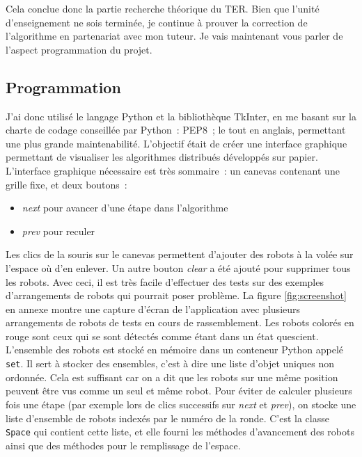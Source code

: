 Cela conclue donc la partie recherche théorique du TER. Bien que l'unité
d'enseignement ne sois terminée, je continue à prouver la correction de
l'algorithme en partenariat avec mon tuteur. Je vais maintenant vous parler de
l'aspect programmation du projet.

\subsection{Programmation}

J'ai donc utilisé le langage Python et la bibliothèque TkInter, en me basant
sur la charte de codage conseillée par Python~: PEP8~; le tout en anglais,
permettant une plus grande maintenabilité. L'objectif était de créer une
interface graphique permettant de visualiser les algorithmes distribués
développés sur papier. \\

L'interface graphique nécessaire est très sommaire~: un canevas contenant une
grille fixe, et deux boutons~:
\begin{itemize}
  \item \emph{next} pour avancer d'une étape dans l'algorithme
  \item \emph{prev} pour reculer
\end{itemize}
Les clics de la souris sur le canevas permettent d'ajouter des robots à la
volée sur l'espace où d'en enlever. Un autre bouton \emph{clear} a été ajouté
pour supprimer tous les robots. Avec ceci, il est très facile d'effectuer des
tests sur des exemples d'arrangements de robots qui pourrait poser problème. La
figure \ref{fig:screenshot} en annexe montre une capture d'écran de
l'application avec plusieurs arrangements de robots de tests en cours de
rassemblement. Les robots colorés en rouge sont ceux qui se sont détectés comme
étant dans un état quescient. \\

L'ensemble des robots est stocké en mémoire dans un conteneur Python appelé
\texttt{set}. Il sert à stocker des ensembles, c'est à dire une liste d'objet
uniques non ordonnée. Cela est suffisant car on a dit que les robots sur une
même position peuvent être vus comme un seul et même robot.  Pour éviter de
calculer plusieurs fois une étape (par exemple lors de clics successifs sur
\emph{next} et \emph{prev}), on stocke une liste d'ensemble de robots indexés
par le numéro de la ronde. C'est la classe \texttt{Space} qui contient cette
liste, et elle fourni les méthodes d'avancement des robots ainsi que des
méthodes pour le remplissage de l'espace.


